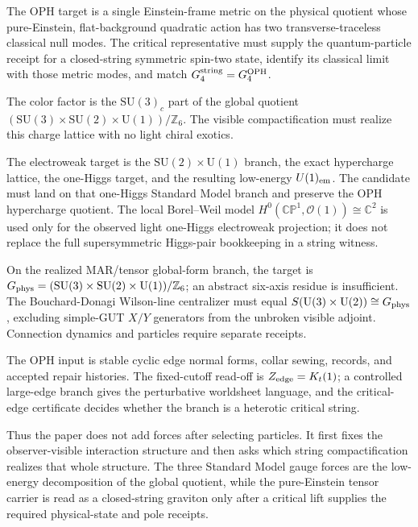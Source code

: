 \documentclass[11pt]{article}
\theoremstyle{remark}
\theoremstyle{plain}
\newcommand{\OPH}{\mathrm{OPH}}
\newcommand{\SU}{\mathrm{SU}}
\newcommand{\U}{\mathrm{U}}
\newcommand{\Z}{\mathbb Z}
\begin{document}
\begin{description}[leftmargin=2em]
\item[Gravity.]
The OPH target is a single Einstein-frame metric on the physical quotient whose pure-Einstein,
flat-background quadratic action has two transverse-traceless classical null modes. The critical
representative must supply the quantum-particle receipt for a closed-string symmetric spin-two state,
identify its classical limit with those metric modes, and match
\(G_4^{\rm string}=G_4^{\OPH}\).

\item[Strong force.]
The color factor is the \(\SU(3)_c\) part of the global quotient
\((\SU(3)\times\SU(2)\times\U(1))/\Z_6\). The visible compactification must realize this charge
lattice with no light chiral exotics.

\item[Weak and electromagnetic forces.]
The electroweak target is the \(\SU(2)\times\U(1)\) branch, the exact hypercharge lattice, the
one-Higgs target, and the resulting low-energy \(U(1)_{\rm em}\). The candidate must land on that
one-Higgs Standard Model branch and preserve the OPH hypercharge quotient.
The local Borel--Weil model \(H^0(\mathbb{CP}^1,\mathcal O(1))\cong\mathbb C^2\) is used only for
the observed light one-Higgs electroweak projection; it does not replace the full supersymmetric
Higgs-pair bookkeeping in a string witness.

\item[Standard Model gauge group.]
On the realized MAR/tensor global-form branch, the target is
\(G_{\rm phys}=(\SU(3)\times\SU(2)\times\U(1))/\Z_6\); an abstract six-axis
residue is insufficient. The Bouchard-Donagi Wilson-line centralizer must equal
\(S(\U(3)\times\U(2))\cong G_{\rm phys}\), excluding simple-GUT \(X/Y\) generators from the
unbroken visible adjoint. Connection dynamics and particles require separate receipts.

\item[Effective string theory.]
The OPH input is stable cyclic edge normal forms, collar sewing, records, and accepted repair
histories. The fixed-cutoff read-off is \(Z_{\rm edge}=K_t(1)\); a controlled large-edge branch
gives the perturbative worldsheet language, and the critical-edge certificate decides whether the
branch is a heterotic critical string.
\end{description}

Thus the paper does not add forces after selecting particles. It first fixes the
observer-visible interaction structure and then asks which string compactification realizes that
whole structure. The three Standard Model gauge forces are the low-energy decomposition of the
global quotient, while the pure-Einstein tensor carrier is read as a closed-string graviton only
after a critical lift supplies the required physical-state and pole receipts.
\end{document}
